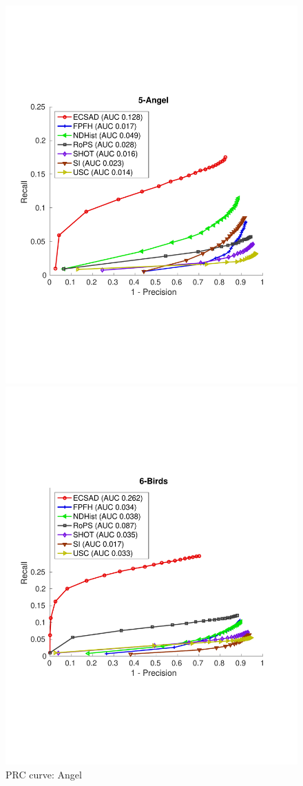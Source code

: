 \documentclass[10pt,twocolumn,letterpaper]{article}
\begin{document}
\begin{figure}[h]
\begin{minipage}[b]{.3\textwidth}
\includegraphics[clip, trim=0.7cm 6cm 0.7cm 6cm,width=1.0\linewidth, height= 1.0\linewidth, keepaspectratio]{img/5-Angel_L2_RATIO_zoom.pdf} 
\caption{PRC curve: Angel }\label{fig:angel}
\end{minipage}\qquad
\begin{minipage}[b]{.3\textwidth}
\includegraphics[clip, trim=0.7cm 6cm 0.7cm 6cm,width=1.0\linewidth, height= 1.0\linewidth, keepaspectratio]{img/6-Birds_L2_RATIO_zoom.pdf}

\end{minipage}
\end{figure}
\end{document}
